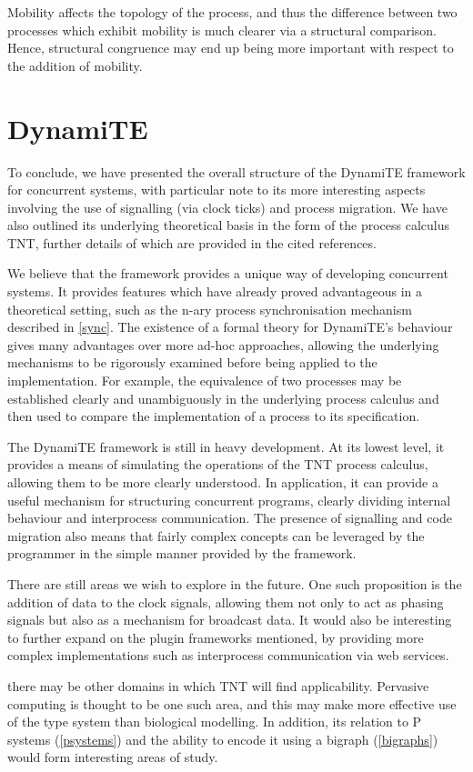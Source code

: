 Mobility affects the topology of the process, and thus the difference
between two processes which exhibit mobility is much clearer via a
structural comparison.  Hence, structural congruence may end up being
more important with respect to the addition of mobility.

\section{DynamiTE}
\label{futuredynamite}

To conclude, we have presented the overall structure of the DynamiTE
framework for concurrent systems, with particular note to its more
interesting aspects involving the use of signalling (via clock ticks)
and process migration.  We have also outlined its underlying theoretical
basis in the form of the process calculus TNT, further details of which
are provided in the cited references.

We believe that the framework provides a unique way of developing
concurrent systems.  It provides features which have already proved
advantageous in a theoretical setting, such as the n-ary process
synchronisation mechanism described in \ref{sync}.  The existence of a
formal theory for DynamiTE's behaviour gives many advantages over more
ad-hoc approaches, allowing the underlying mechanisms to be rigorously
examined before being applied to the implementation.  For example, the
equivalence of two processes may be established clearly and
unambiguously in the underlying process calculus and then used to
compare the implementation of a process to its specification.

The DynamiTE framework is still in heavy development.  At its lowest
level, it provides a means of simulating the operations of the TNT
process calculus, allowing them to be more clearly understood.  In
application, it can provide a useful mechanism for structuring
concurrent programs, clearly dividing internal behaviour and
interprocess communication.  The presence of signalling and code
migration also means that fairly complex concepts can be leveraged by
the programmer in the simple manner provided by the framework.

There are still areas we wish to explore in the future.  One such
proposition is the addition of data to the clock signals,
\balancecolumns \noindent allowing them
not only to act as phasing signals but also as a mechanism for broadcast
data.  It would also be interesting to further expand on the plugin
frameworks mentioned, by providing more complex implementations such as
interprocess communication via web services.

there may
be other domains in which TNT will find applicability.  Pervasive
computing is thought to be one such area, and this may make more
effective use of the type system than biological modelling.  In
addition, its relation to P systems (\ref{psystems}) and the ability to
encode it using a bigraph (\ref{bigraphs}) would form interesting areas
of study.
